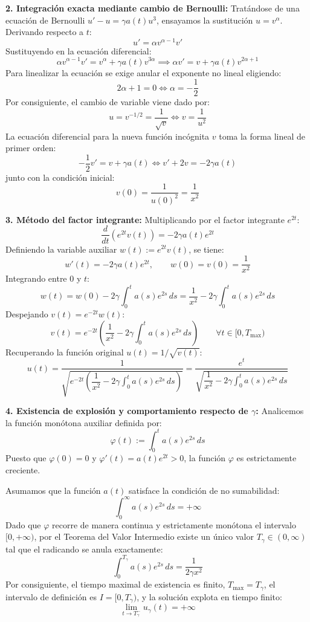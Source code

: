 {    \textbf{2. Integración exacta mediante cambio de Bernoulli:}
    Tratándose de una ecuación de Bernoulli $u' - u = \gamma a(t) u^3$, ensayamos la sustitución $u = v^\alpha$. Derivando respecto a $t$:
    \[
        u' = \alpha v^{\alpha - 1} v'
    \]
    Sustituyendo en la ecuación diferencial:
    \[
        \alpha v^{\alpha - 1} v' = v^\alpha + \gamma a(t) v^{3\alpha} \implies \alpha v' = v + \gamma a(t) v^{2\alpha + 1}
    \]
    Para linealizar la ecuación se exige anular el exponente no lineal eligiendo:
    \[
        2\alpha + 1 = 0 \iff \alpha = -\frac{1}{2}
    \]
    Por consiguiente, el cambio de variable viene dado por:
    \[
        u = v^{-1/2} = \frac{1}{\sqrt{v}} \iff v = \frac{1}{u^2}
    \]
    La ecuación diferencial para la nueva función incógnita $v$ toma la forma lineal de primer orden:
    \[
        -\frac{1}{2} v' = v + \gamma a(t) \iff v' + 2v = -2\gamma a(t)
    \]
    junto con la condición inicial:
    \[
        v(0) = \frac{1}{u(0)^2} = \frac{1}{x^2}
    \]
    
    \textbf{3. Método del factor integrante:}
    Multiplicando por el factor integrante $e^{2t}$:
    \[
        \frac{d}{dt}\left( e^{2t} v(t) \right) = -2\gamma a(t) e^{2t}
    \]
    Definiendo la variable auxiliar $w(t) := e^{2t} v(t)$, se tiene:
    \[
        w'(t) = -2\gamma a(t) e^{2t}, \qquad w(0) = v(0) = \frac{1}{x^2}
    \]
    Integrando entre $0$ y $t$:
    \[
        w(t) = w(0) - 2\gamma \int_0^t a(s) e^{2s} \, ds = \frac{1}{x^2} - 2\gamma \int_0^t a(s) e^{2s} \, ds
    \]
    Despejando $v(t) = e^{-2t} w(t)$:
    \[
        v(t) = e^{-2t} \left( \frac{1}{x^2} - 2\gamma \int_0^t a(s) e^{2s} \, ds \right) \qquad \forall t \in [0, T_{\max})
    \]
    Recuperando la función original $u(t) = 1/\sqrt{v(t)}$:
    \[
        u(t) = \frac{1}{\sqrt{e^{-2t} \left( \dfrac{1}{x^2} - 2\gamma \displaystyle\int_0^t a(s) e^{2s} \, ds \right)}} = \frac{e^t}{\sqrt{\dfrac{1}{x^2} - 2\gamma \displaystyle\int_0^t a(s) e^{2s} \, ds}}
    \]

    \textbf{4. Existencia de explosión y comportamiento respecto de $\gamma$:}
    Analicemos la función monótona auxiliar definida por:
    \[
        \varphi(t) := \int_0^t a(s) e^{2s} \, ds
    \]
    Puesto que $\varphi(0) = 0$ y $\varphi'(t) = a(t) e^{2t} > 0$, la función $\varphi$ es estrictamente creciente.
    
    Asumamos que la función $a(t)$ satisface la condición de no sumabilidad:
    \[
        \int_0^\infty a(s) e^{2s} \, ds = +\infty
    \]
    Dado que $\varphi$ recorre de manera continua y estrictamente monótona el intervalo $[0, +\infty)$, por el Teorema del Valor Intermedio existe un único valor $T_\gamma \in (0, \infty)$ tal que el radicando se anula exactamente:
    \[
        \int_0^{T_\gamma} a(s) e^{2s} \, ds = \frac{1}{2\gamma x^2}
    \]
    Por consiguiente, el tiempo maximal de existencia es finito, $T_{\max} = T_\gamma$, el intervalo de definición es $I = [0, T_\gamma)$, y la solución explota en tiempo finito:
    \[
        \lim_{t \to T_\gamma^-} u_\gamma(t) = +\infty
    \]
    
}

